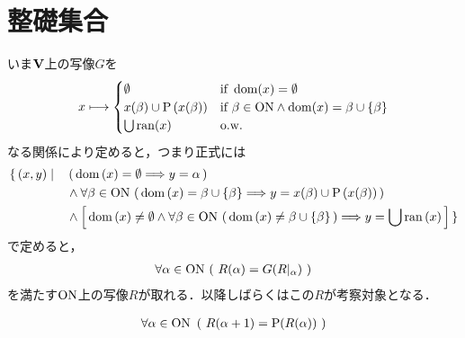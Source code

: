 \section{整礎集合}
	いま$\mathbf{V}$上の写像$G$を
	\begin{align}
		x \longmapsto
		\begin{cases}
			\emptyset & \mbox{if } \operatorname{dom}(x) = \emptyset \\
			x(\beta) \cup \operatorname*{P} \left(x(\beta)\right) & \mbox{if } \beta \in \mathrm{ON} \wedge \operatorname{dom}(x) = \beta \cup \{\beta\} \\
			\bigcup \operatorname{ran}(x) & \mathrm{o.w.}
		\end{cases}
	\end{align}
	なる関係により定めると，つまり正式には
	\begin{align}
		\{\, (x,y) \mid \quad &\left(\, \operatorname*{dom} \left(x\right) = \emptyset \Longrightarrow y = \alpha\, \right) \\
		&\wedge \forall \beta \in \mathrm{ON}\, \left(\, \operatorname*{dom} \left(x\right) = \beta \cup \{\beta\} \Longrightarrow y = x(\beta) \cup \operatorname*{P} \left(x(\beta)\right)\, \right) \\
		&\wedge \left[\, \operatorname*{dom} \left(x\right) \neq \emptyset \wedge \forall \beta \in \mathrm{ON}\, \left(\, \operatorname*{dom} \left(x\right) \neq \beta \cup \{\beta\}\, \right)
		\Longrightarrow y = \bigcup \operatorname*{ran} \left(x\right)\, \right]\, \}
	\end{align}
	で定めると，
	\begin{align}
		\forall \alpha \in \mathrm{ON}\ (\ R(\alpha) = G(R|_\alpha)\ )
	\end{align}
	を満たす$\mathrm{ON}$上の写像$R$が取れる．以降しばらくはこの$R$が考察対象となる．
	
	\begin{screen}
		\begin{thm}
			\begin{align}\label{thm:R_alpha_plus_1_equals_to_power_of_R_alpha}
				\forall \alpha \in \ON\ 
				\left(\ R(\alpha + 1) = \operatorname{P}(R(\alpha))\ \right)
			\end{align}
		\end{thm}
	\end{screen}
	

